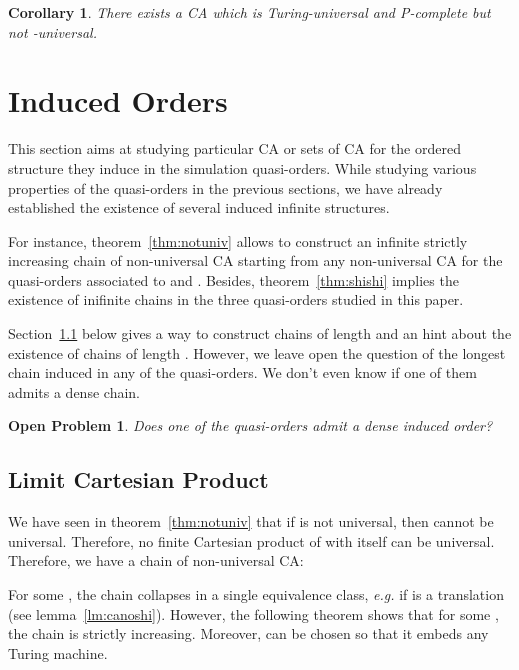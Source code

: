 \documentclass[a4paper]{elsarticle}
\newtheorem{openpb}{Open Problem}
\newtheorem{cor}{Corollary}[section]
\begin{document}
\begin{cor}
  There exists a CA which is Turing-universal and P-complete but not
  -universal.
\end{cor}


\section{Induced Orders}
\label{sec:io}

This section aims at studying particular CA or sets of CA for the
ordered structure they induce in the simulation quasi-orders.  While
studying various properties of the quasi-orders in the previous
sections, we have already established the existence of several induced
infinite structures.

For instance, theorem~\ref{thm:notuniv} allows to construct an
infinite strictly increasing chain of non-universal CA starting from
any non-universal CA for the quasi-orders associated to  and
.  Besides, theorem~\ref{thm:shishi} implies the
existence of inifinite chains in the three quasi-orders studied in this
paper.

Section~\ref{sec:limprod} below gives a way to construct chains of
length  and an hint about the existence of chains of
length . However, we leave open the question of
the longest chain induced in any of the quasi-orders. We don't even
know if one of them admits a dense chain.

\begin{openpb}
  Does one of the quasi-orders admit a dense induced order?
\end{openpb}

\subsection{Limit Cartesian Product}
\label{sec:limprod}

We have seen in theorem~\ref{thm:notuniv} that if  is not
universal, then  cannot be universal. Therefore, no
finite Cartesian product of  with itself can be
universal. Therefore, we have a chain of non-universal CA:

For some , the chain collapses in a single equivalence class,
\textit{e.g.} if  is a translation (see
lemma~\ref{lm:canoshi}). However, the following theorem shows that for
some , the chain is strictly increasing. Moreover,  can be
chosen so that it embeds any Turing machine. 
\end{document}
